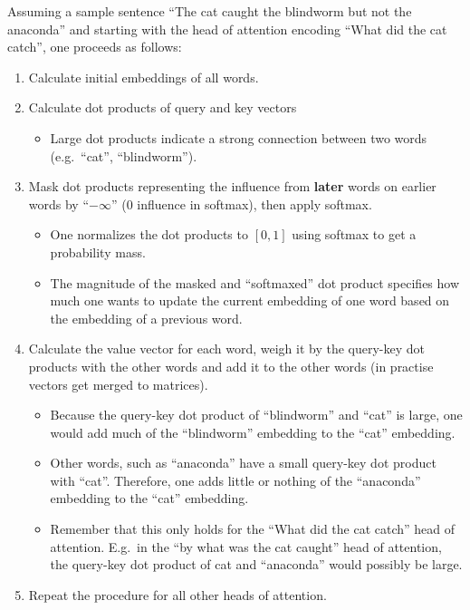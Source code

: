 \begin{examplesection}
    Assuming a sample sentence ``The cat caught the blindworm but not the anaconda'' and starting with the head of attention encoding ``What did the cat catch'', one proceeds as follows:
    \begin{enumerate}
        \item Calculate initial embeddings of all words.
        \item Calculate dot products of query and key vectors
        \begin{itemize}
            \item Large dot products indicate a strong connection between two words (e.g.\ ``cat'', ``blindworm'').
        \end{itemize}
        \item Mask dot products representing the influence from \textbf{later} words on earlier words by ``$-\infty$'' ($0$ influence in softmax), then apply softmax.
        \begin{itemize}
            \item One normalizes the dot products to $[0,1]$ using softmax to get a probability mass.
            \item The magnitude of the masked and ``softmaxed'' dot product specifies how much one wants to update the current embedding of one word based on the embedding of a previous word.
        \end{itemize}
        \item Calculate the value vector for each word, weigh it by the query-key dot products with the other words and add it to the other words (in practise vectors get merged to matrices).
        \begin{itemize}
            \item Because the query-key dot product of ``blindworm'' and ``cat'' is large, one would add much of the ``blindworm'' embedding to the ``cat'' embedding.
            \item Other words, such as ``anaconda'' have a small query-key dot product with ``cat''. Therefore, one adds little or nothing of the ``anaconda'' embedding to the ``cat'' embedding.
            \item Remember that this only holds for the ``What did the cat catch'' head of attention. E.g.\ in the ``by what was the cat caught'' head of attention, the query-key dot product of cat and ``anaconda'' would possibly be large.
        \end{itemize}
        \item Repeat the procedure for all other heads of attention.
    \end{enumerate}
\end{examplesection}

